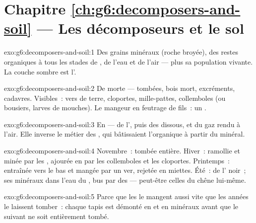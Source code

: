 \section*{Chapitre \ref{ch:g6:decomposers-and-soil} --- Les décomposeurs et le sol}

\begin{solution}{exo:g6:decomposers-and-soil:1}
Des grains minéraux (roche broyée), des restes organiques à tous les
stades de , de l'eau et de l'air --- plus sa population
vivante. La couche sombre est l'.
\end{solution}

\begin{solution}{exo:g6:decomposers-and-soil:2}
De  morte ---  tombées, bois mort,
excréments, cadavres. Visibles~: vers de terre, cloportes,
mille-pattes, collemboles (ou bousiers, larves de mouches). Le
mangeur en feutrage de fils~: un .
\end{solution}

\begin{solution}{exo:g6:decomposers-and-soil:3}
En  --- de l', puis des  dissous,
et du gaz rendu à l'air. Elle inverse le métier des , qui
bâtissaient l'organique à partir du minéral.
\end{solution}

\begin{solution}{exo:g6:decomposers-and-soil:4}
Novembre~: tombée entière. Hiver~: ramollie et minée par les
, ajourée en  par les collemboles et les
cloportes. Printemps~: entraînée vers le bas et mangée par un ver,
rejetée en miettes. Été~: de l' noir~; ses minéraux dans l'eau
du , bus par des  --- peut-être celles du chêne lui-même.
\end{solution}

\begin{solution}{exo:g6:decomposers-and-soil:5}
Parce que les  le mangent aussi vite que les années le
laissent tomber~: chaque tapis est démonté en  et en minéraux
avant que le suivant ne soit entièrement tombé.
\end{solution}

